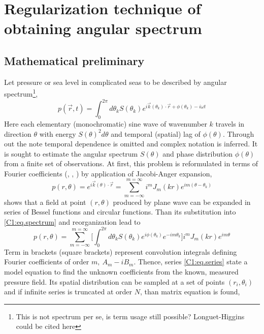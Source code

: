 \section{Regularization technique of obtaining angular spectrum}
\subsection{Mathematical preliminary}
Let pressure or sea level in complicated seas to be described by angular spectrum\footnote{This is 
not spectrum per se, is term usage still possible? Longuet-Higgins could be cited here},
\begin{equation}
\label{C1:eq.spectrum}
p(\vec{r}, t) = \int_0^{2\pi}  d\theta_k S(\theta_k) e^{i \vec{k}(\theta_k) \cdot \vec{r} + \phi(\theta_k) - i \omega t}
\end{equation}
Here each elementary (monochromatic) sine wave of wavenumber $k$ travels in direction $\theta$ with 
energy $S(\theta)^2 d\theta$ and temporal (spatial) lag of $\phi(\theta)$. Through out the note 
temporal dependence is omitted and complex notation is inferred. It is sought to estimate the 
angular spectrum $S(\theta)$ and phase distribution $\phi(\theta)$ from a finite set of 
observations. At first, this problem is reformulated in terms of Fourier coefficients 
(\cite{munk1963directional}, \cite{benoit1997analysing}, \cite{rafaely2004plane}) by application of 
Jacobi-Anger expansion,
\begin{equation}
p(r, \theta) = e^{i \vec{k}(\theta) \cdot \vec{r}} = \sum_{m = -\infty}^{m = \infty} i^{m} J_{m}(k r) e^{im(\theta - \theta_k)}
\end{equation}
shows that a field at point $(r, \theta)$ produced by plane wave can be expanded in series of Bessel functions and circular functions. Than its substitution into \eqref{C1:eq.spectrum} and reorganization lead to
\begin{equation}
\label{C1:eq.series}
p(r, \theta) = \sum_{m=-\infty}^{m=\infty} \big[ \int_0^{2\pi}  d\theta_k S(\theta_k) e^{i\phi(\theta_k)} e^{-im\theta_k} \big] i^m J_m(kr) e^{im\theta}
\end{equation}
Term in brackets (square brackets) represent convolution integrals defining Fourier coefficients of 
order $m,~A_m - i B_m$. Thence, series \eqref{C1:eq.series} state a model equation to find the 
unknown coefficients from the known, measured pressure field. Its spatial distribution can be 
sampled at a set of points $(r_i, \theta_i)$ and if infinite series is truncated at order $N$, 
than matrix equation is found,
